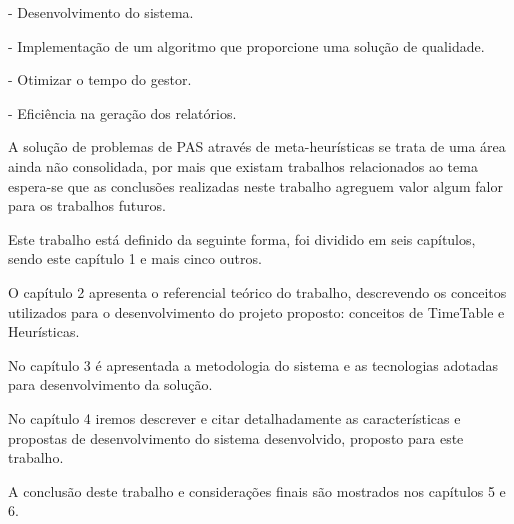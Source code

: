 
	- Desenvolvimento do sistema.\par

	- Implementação de um algoritmo que proporcione uma solução de qualidade.

	- Otimizar o tempo do gestor.\par

	- Eficiência na geração dos relatórios.\par


A solução de problemas de PAS através de meta-heurísticas se trata de uma área ainda não consolidada, por mais que existam trabalhos relacionados ao tema espera-se que as conclusões realizadas neste trabalho agreguem valor algum falor para os trabalhos futuros.


Este trabalho está definido da seguinte forma, foi dividido em seis capítulos, sendo este capítulo 1 e mais cinco outros.\par

O capítulo 2 apresenta o referencial teórico do trabalho, descrevendo os conceitos utilizados para o desenvolvimento do projeto proposto: conceitos de TimeTable e Heurísticas.\par

No capítulo 3 é apresentada a metodologia do sistema e as tecnologias adotadas para desenvolvimento da solução.\par

No capítulo 4 iremos descrever e citar detalhadamente as características e propostas de desenvolvimento do sistema desenvolvido, proposto para este trabalho.\par

A conclusão deste trabalho e considerações finais são mostrados nos capítulos 5 e 6.\par